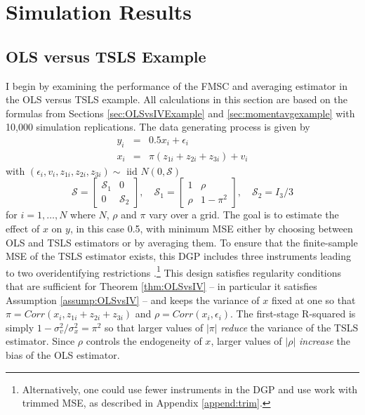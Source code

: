 \section{Simulation Results}
\label{sec:simulations}
\subsection{OLS versus TSLS Example}
\label{sec:OLSvsIVsim}
I begin by examining the performance of the FMSC and averaging estimator in the OLS versus TSLS example.
All calculations in this section are based on the formulas from Sections \ref{sec:OLSvsIVExample} and \ref{sec:momentavgexample} with 10,000 simulation replications. 
The data generating process is given by 
\begin{eqnarray}
	y_i &=& 0.5 x_i + \epsilon_i\\
	\label{eq:OLSvsIVDGP1}
	x_i &=& \pi(z_{1i} + z_{2i} + z_{3i}) + v_i
	\label{eq:OLSvsIVDGP2}
\end{eqnarray}
with $(\epsilon_i, v_i, z_{1i}, z_{2i}, z_{3i}) \sim \mbox{ iid } N(0, \mathcal{S})$
\begin{equation}
	\mathcal{S} = \left[ \begin{array}
		{cc} \mathcal{S}_1 & 0 \\ 0 & \mathcal{S}_2
	\end{array} \right], \quad 
	\mathcal{S}_1 = \left[ \begin{array}
		{cc} 1 & \rho \\ \rho & 1 - \pi^2 
	\end{array} \right], \quad \mathcal{S}_2 = I_3 / 3
	\label{eq:OLSvsIVDGP3}
\end{equation}
for $i= 1, \hdots, N$ where $N$, $\rho$ and $\pi$ vary over a grid.
The goal is to estimate the effect of $x$ on $y$, in this case 0.5, with minimum MSE either by choosing between OLS and TSLS estimators or by averaging them.
To ensure that the finite-sample MSE of the TSLS estimator exists, this DGP includes three instruments leading to two overidentifying restrictions \citep{Phillips1980}.\footnote{Alternatively, one could use fewer instruments in the DGP and use work with trimmed MSE, as described in Appendix \ref{append:trim}.}
This design satisfies regularity conditions that are sufficient for Theorem \ref{thm:OLSvsIV} -- in particular it satisfies Assumption \ref{assump:OLSvsIV} -- and keeps the variance of $x$ fixed at one so that $\pi = Corr(x_i, z_{1i} + z_{2i} + z_{3i})$ and $\rho = Corr(x_i,\epsilon_i)$.
The first-stage R-squared is simply $1 - \sigma_v^2/\sigma_x^2 = \pi^2$ so that larger values of $|\pi|$ \emph{reduce} the variance of the TSLS estimator.
Since $\rho$ controls the endogeneity of $x$, larger values of $|\rho|$ \emph{increase} the bias of the OLS estimator.

